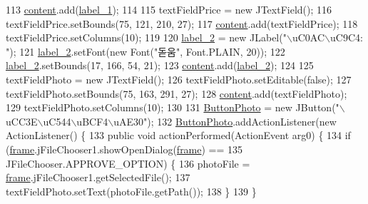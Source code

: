 \begin{DoxyCode}
113         \hyperlink{classpkg_1_1_product_u_i_a4b906446ebd18ba32a11ace86f26fe12}{content}.add(\hyperlink{classpkg_1_1_product_u_i_a77b14da002223a885455d165ca197069}{label\_1});
114         
115         textFieldPrice = \textcolor{keyword}{new} JTextField();
116         textFieldPrice.setBounds(75, 121, 210, 27);
117         \hyperlink{classpkg_1_1_product_u_i_a4b906446ebd18ba32a11ace86f26fe12}{content}.add(textFieldPrice);
118         textFieldPrice.setColumns(10);
119         
120         \hyperlink{classpkg_1_1_product_u_i_aa6f63b0826c3405cf68c4b8e68ca07ed}{label\_2} = \textcolor{keyword}{new} JLabel(\textcolor{stringliteral}{"\(\backslash\)uC0AC\(\backslash\)uC9C4: "});
121         \hyperlink{classpkg_1_1_product_u_i_aa6f63b0826c3405cf68c4b8e68ca07ed}{label\_2}.setFont(\textcolor{keyword}{new} Font(\textcolor{stringliteral}{"돋움"}, Font.PLAIN, 20));
122         \hyperlink{classpkg_1_1_product_u_i_aa6f63b0826c3405cf68c4b8e68ca07ed}{label\_2}.setBounds(17, 166, 54, 21);
123         \hyperlink{classpkg_1_1_product_u_i_a4b906446ebd18ba32a11ace86f26fe12}{content}.add(\hyperlink{classpkg_1_1_product_u_i_aa6f63b0826c3405cf68c4b8e68ca07ed}{label\_2});
124         
125         textFieldPhoto = \textcolor{keyword}{new} JTextField();
126         textFieldPhoto.setEditable(\textcolor{keyword}{false});
127         textFieldPhoto.setBounds(75, 163, 291, 27);
128         \hyperlink{classpkg_1_1_product_u_i_a4b906446ebd18ba32a11ace86f26fe12}{content}.add(textFieldPhoto);
129         textFieldPhoto.setColumns(10);
130         
131         \hyperlink{classpkg_1_1_product_u_i_a8d114c269e1d1294e82573b7e54e4c54}{ButtonPhoto} = \textcolor{keyword}{new} JButton(\textcolor{stringliteral}{"\(\backslash\)uCC3E\(\backslash\)uC544\(\backslash\)uBCF4\(\backslash\)uAE30"});
132         \hyperlink{classpkg_1_1_product_u_i_a8d114c269e1d1294e82573b7e54e4c54}{ButtonPhoto}.addActionListener(\textcolor{keyword}{new} ActionListener() \{
133             \textcolor{keyword}{public} \textcolor{keywordtype}{void} actionPerformed(ActionEvent arg0) \{
134                 \textcolor{keywordflow}{if} (\hyperlink{classpkg_1_1_product_u_i_a49f9ae805cdac34c866e6c1593b6e625}{frame}.jFileChooser1.showOpenDialog(\hyperlink{classpkg_1_1_product_u_i_a49f9ae805cdac34c866e6c1593b6e625}{frame}) ==
135                         JFileChooser.APPROVE\_OPTION) \{
136                     photoFile = \hyperlink{classpkg_1_1_product_u_i_a49f9ae805cdac34c866e6c1593b6e625}{frame}.jFileChooser1.getSelectedFile();
137                     textFieldPhoto.setText(photoFile.getPath());
138                 \}
139             \}

\end{DoxyCode}
